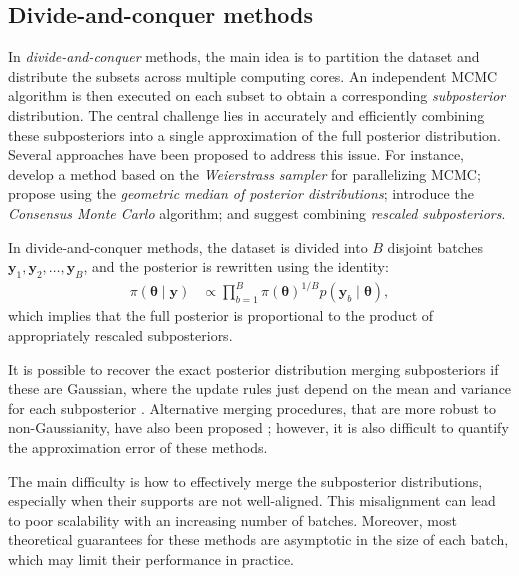 \subsection{Divide-and-conquer methods}
In \textit{divide-and-conquer} methods, the main idea is to partition the dataset and distribute the subsets across multiple computing cores. An independent MCMC algorithm is then executed on each subset to obtain a corresponding \textit{subposterior} distribution. The central challenge lies in accurately and efficiently combining these subposteriors into a single approximation of the full posterior distribution. Several approaches have been proposed to address this issue. For instance, \cite{wang2013parallelizing} develop a method based on the \textit{Weierstrass sampler} for parallelizing MCMC; \cite{minsker2015scalable} propose using the \textit{geometric median of posterior distributions}; \cite{scott2016bayes, rendell2020global, scott2022bayes} introduce the \textit{Consensus Monte Carlo} algorithm; and \cite{wu2017average} suggest combining \textit{rescaled subposteriors}.

In divide-and-conquer methods, the dataset is divided into \( B \) disjoint batches $\mathbf{y}_1, \mathbf{y}_2, \dots, \mathbf{y}_B$, and the posterior is rewritten using the identity:
\begin{align*}
	\pi(\boldsymbol{\theta} \mid \mathbf{y}) &\propto \prod_{b=1}^B \pi(\boldsymbol{\theta})^{1/B} p(\mathbf{y}_b \mid \boldsymbol{\theta}),
\end{align*}
which implies that the full posterior is proportional to the product of appropriately rescaled subposteriors.

It is possible to recover the exact posterior distribution merging subposteriors if these are Gaussian, where the update rules just depend on the mean and variance for each subposterior \cite{scott2016bayes,scott2022bayes}. Alternative merging procedures, that are more robust to non-Gaussianity, have also been proposed \cite{neiswanger2013asymptotically,minsker2017robust}; however, it is also difficult to quantify the approximation error of these methods. 

The main difficulty is how to effectively merge the subposterior distributions, especially when their supports are not well-aligned. This misalignment can lead to poor scalability with an increasing number of batches. Moreover, most theoretical guarantees for these methods are asymptotic in the size of each batch, which may limit their performance in practice.



